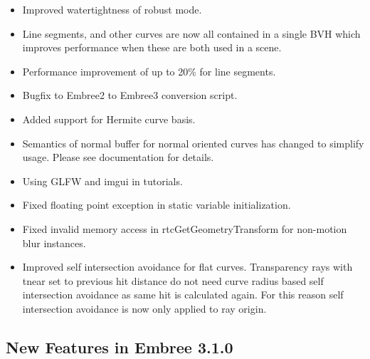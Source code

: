 \begin{itemize}
\tightlist
\item
  Improved watertightness of robust mode.
\item
  Line segments, and other curves are now all contained in a single BVH
  which improves performance when these are both used in a scene.
\item
  Performance improvement of up to 20\% for line segments.
\item
  Bugfix to Embree2 to Embree3 conversion script.
\item
  Added support for Hermite curve basis.
\item
  Semantics of normal buffer for normal oriented curves has changed to
  simplify usage. Please see documentation for details.
\item
  Using GLFW and imgui in tutorials.
\item
  Fixed floating point exception in static variable initialization.
\item
  Fixed invalid memory access in rtcGetGeometryTransform for non-motion
  blur instances.
\item
  Improved self intersection avoidance for flat curves. Transparency
  rays with tnear set to previous hit distance do not need curve radius
  based self intersection avoidance as same hit is calculated again. For
  this reason self intersection avoidance is now only applied to ray
  origin.
\end{itemize}

\subsection{New Features in Embree
3.1.0}\label{new-features-in-embree-3.1.0}

